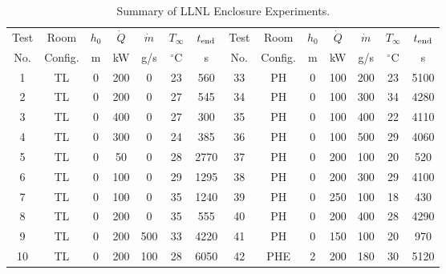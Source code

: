 \begin{table}[p]
\caption[Summary of LLNL Enclosure Experiments]{Summary of LLNL Enclosure Experiments.}
\begin{center}
\begin{tabular}{|c|c|c|c|c|c|c||c|c|c|c|c|c|c|}
\hline
Test & Room    & $h_0$ &  $\dot{Q}$ & $\dot{m}$ & $T_\infty$ & $t_{\rm end}$  &   Test & Room    & $h_0$ &  $\dot{Q}$ & $\dot{m}$ & $T_\infty$ & $t_{\rm end}$  \\
No.  & Config. & m     &  kW        & g/s       & $^\circ$C  & s              &   No.  & Config. & m     &  kW        & g/s       & $^\circ$C  & s           \\ \hline \hline
1    & TL      & 0     & 200        & 0         & 23         & 560            &   33   & PH      & 0     & 100        & 200       & 23         & 5100        \\ \hline
2    & TL      & 0     & 200        & 0         & 27         & 545            &   34   & PH      & 0     & 100        & 300       & 34         & 4280        \\ \hline
3    & TL      & 0     & 400        & 0         & 27         & 300            &   35   & PH      & 0     & 100        & 400       & 22         & 4110        \\ \hline
4    & TL      & 0     & 300        & 0         & 24         & 385            &   36   & PH      & 0     & 100        & 500       & 29         & 4060        \\ \hline
5    & TL      & 0     & 50         & 0         & 28         & 2770           &   37   & PH      & 0     & 200        & 100       & 20         & 520         \\ \hline
6    & TL      & 0     & 100        & 0         & 29         & 1295           &   38   & PH      & 0     & 200        & 300       & 29         & 4100        \\ \hline
7    & TL      & 0     & 100        & 0         & 35         & 1240           &   39   & PH      & 0     & 250        & 100       & 18         & 430         \\ \hline
8    & TL      & 0     & 200        & 0         & 35         & 555            &   40   & PH      & 0     & 200        & 400       & 28         & 4290        \\ \hline
9    & TL      & 0     & 200        & 500       & 33         & 4220           &   41   & PH      & 0     & 150        & 100       & 20         & 970         \\ \hline
10   & TL      & 0     & 200        & 100       & 28         & 6050           &   42   & PHE     & 2     & 200        & 180       & 30         & 5120        \\ \hline

\end{tabular}
\end{center}
\end{table}
